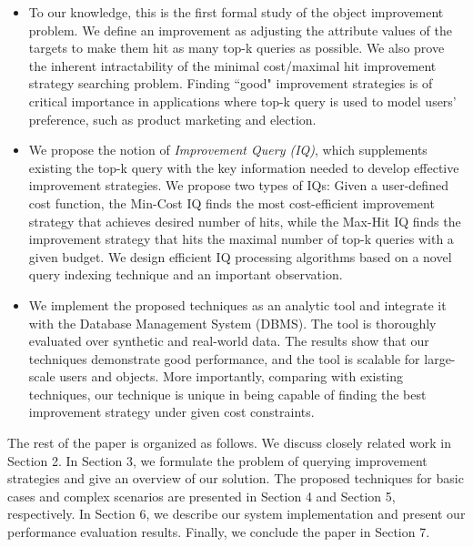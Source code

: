 \begin{itemize}
\item To our knowledge, this is the first formal study of the object improvement problem. We define an improvement as adjusting the attribute values of the targets to make them hit as many top-k queries as possible. We also prove the inherent intractability of the minimal cost/maximal hit improvement strategy searching problem. Finding ``good" improvement strategies is of critical importance in applications where top-k query is used to model users' preference, such as product marketing and election.

\item We propose the notion of \textit{Improvement Query (IQ)}, which supplements existing the top-k query with the key information needed to develop effective improvement strategies. We propose two types of IQs: Given a user-defined cost function, the Min-Cost IQ finds the most cost-efficient improvement strategy that achieves desired number of hits, while the Max-Hit IQ finds the improvement strategy that hits the maximal number of top-k queries with a given budget. We design efficient IQ processing algorithms based on a novel query indexing technique and an important observation.

\item We implement the proposed techniques as an analytic tool and integrate it with the Database Management System (DBMS). The tool is thoroughly evaluated over synthetic and real-world data. The results show that our techniques demonstrate good performance, and the tool is scalable for large-scale users and objects. More importantly, comparing with existing techniques, our technique is unique in being capable of finding the best improvement strategy under given cost constraints.
\end{itemize}

The rest of the paper is organized as follows. We discuss closely related work in Section 2. In Section 3, we formulate the problem of querying improvement strategies and give an overview of our solution. The proposed techniques for basic cases and complex scenarios are presented in Section 4 and Section 5, respectively. In Section 6, we describe our system implementation and present our performance evaluation results. Finally, we conclude the paper in Section 7.